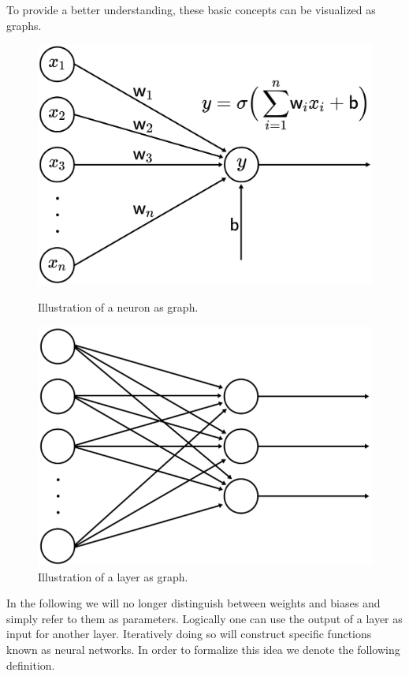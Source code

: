 \documentclass[11pt, a4paper]{article}
\begin{document}
To provide a better understanding, these basic concepts can be visualized as graphs.

\begin{figure}[!h]
	\begin{minipage}[c]{0.5\linewidth}
	\centering
	\includegraphics[width=0.9\linewidth]{images/neuron.png}
      		\caption{Illustration of a neuron as graph.}
	\end{minipage}
	\hfill
	\begin{minipage}[c]{0.5\linewidth}
	\centering
	\includegraphics[width=0.9\linewidth]{images/layer.png}
      		\caption{Illustration of a layer as graph.}
	\end{minipage}
\end{figure}

In the following we will no longer distinguish between weights and biases and simply refer to them as parameters. Logically one can use the output of a layer as input for another layer. Iteratively doing so will construct specific functions known as neural networks. In order to formalize this idea we denote the following definition. \\ \\
\end{document}

